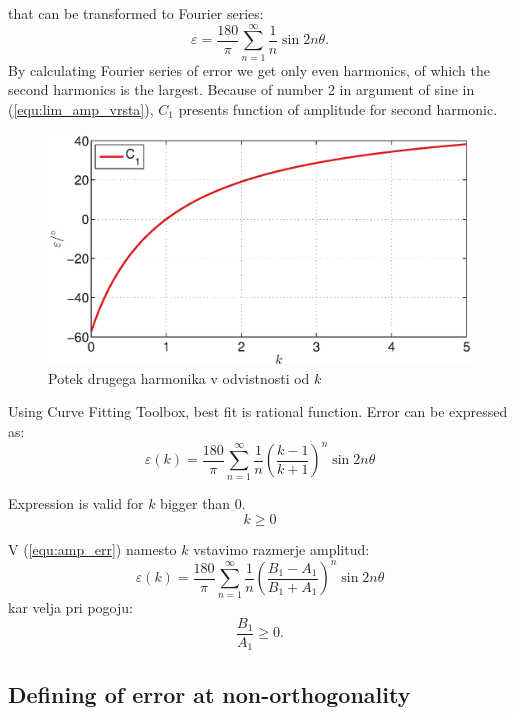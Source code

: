 \documentclass[a4paper]{article}
\begin{document}
that can be transformed to Fourier series:
\begin{equation}
\label{equ:lim_amp_vrsta}
\varepsilon = \frac{180}{\pi}\sum_{n=1}^{\infty}\frac{1}{n} \sin 2 n \theta.
\end{equation}
By calculating Fourier series of error we get only even harmonics, of which the second harmonics is the largest.
Because of number 2 in argument of sine in (\ref{equ:lim_amp_vrsta}), $C_1$ presents function of amplitude for second harmonic. 
\begin{figure}[!htb]
	\begin{center}
		\includegraphics[width=\linewidth]{./Slike/amp.eps}
		\caption{Potek drugega harmonika v odvistnosti od $k$} \label{fig:amp}
	\end{center}
\end{figure}

Using Curve Fitting Toolbox, best fit is rational function. Error can be expressed as:
\begin{equation}
\label{equ:amp_err}
\varepsilon(k) =\frac{180}{\pi}\sum_{n=1}^{\infty}\frac{1}{n}(\frac{k-1}{k+1})^n \sin 2 n \theta
\end{equation}

Expression is valid for  $k$ bigger than 0.$$k \geq 0$$

V (\ref{equ:amp_err}) namesto $k$ vstavimo razmerje amplitud:
\begin{equation}
\label{equ:amp_err2}
\varepsilon(k) =\frac{180}{\pi}\sum_{n=1}^{\infty}\frac{1}{n}(\frac{B_1-A_1}{B_1+A_1})^n \sin 2 n \theta
\end{equation}
kar velja pri pogoju: $$\frac{B_1}{A_1} \geq 0.$$

\subsection{Defining of error at non-orthogonality}
\end{document}
